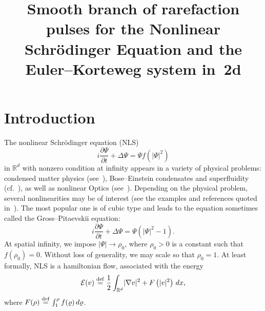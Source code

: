 \documentclass[AHL,Unicode,longabstracts,published]{cedram}
\title[Smooth branch of rarefaction pulses]{Smooth branch of rarefaction pulses for the Nonlinear Schr\"odinger Equation and the Euler--Korteweg system in~2d}
\author[\initial{D.} \lastname{Chiron}]{\firstname{David} \lastname{Chiron}}
\newcommand*\p{\partial}
\newcommand*\R{\mathbb R}
\newcommand*\ddef{\stackrel{\rm def}{=}}
\newcommand*\BE{\mathcal{E}}
\begin{document}
\maketitle

\section{Introduction}

The nonlinear Schr\"odinger equation (NLS)
\begin{equation}
\tag{NLS} i \frac{\p \Psi}{\p t} + \Delta \Psi = \Psi f\left(|\Psi|^2\right)
\end{equation}
in $\R^d $ with nonzero condition at infinity appears in a variety of physical problems: condensed matter physics (see~\cite{Pismen}), Bose--Einstein condensates and superfluidity (cf.~\cite{AHMNPTB:03,RB}), as well as nonlinear Optics (see~\cite{KL}). Depending on the physical problem, several nonlinearities may be of interest (see the examples and references quoted in~\cite{C1d, ChiSch15}). The most popular one is of cubic type and leads to the equation sometimes called the Gross--Pitaevskii equation:
\begin{equation*}
i \frac{\p \Psi}{\p t} + \Delta \Psi = \Psi \left(|\Psi|^2 - 1\right).
\end{equation*}
At spatial infinity, we impose $ | \Psi | \to \rho_0 $, where $ \rho_0 > 0 $ is a constant such that $ f (\rho_0) = 0 $. Without loss of generality, we may scale so that $ \rho_0 =1 $. At least formally, NLS is a hamiltonian flow, associated with the energy
\[
\BE (v) \ddef \frac{1}{2} \int_{\R^d} \lvert \nabla v \rvert^2 + F\left(| v |^2\right) \, dx,
\]
where $ F(\rho) \ddef \int_1^\rho f(\varrho) \, d \varrho $.
\end{document}
